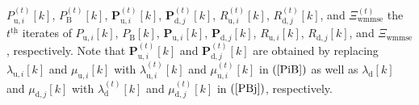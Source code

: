 \documentclass[10pt,journal]{IEEEtran}
\newcommand{\paren}[1]{\left({#1}\right)}
\newcommand{\bracket}[1]{{\left [{#1}\right ]}}
\newcommand{\ith}[1]    {{#1}^{\underline{\text{th}}}}
\newcommand{\PiB}{\mathbf{P}_{\textrm{u},i}\bracket{k}}
\newcommand{\PBj}{\mathbf{P}_{\textrm{d},j}\bracket{k}}
\theoremstyle{definition}
\begin{document}
		$P^{\paren{t}}_{\textrm{u},i}\bracket{k}$, $P^{\paren{t}}_{\textrm{B}}\bracket{k}$,
		$\mathbf{P}^{\paren{t}}_{\textrm{u},i}\bracket{k}$, $\mathbf{P}^{\paren{t}}_{\textrm{d},j}\bracket{k}$, $\mathit{R}^{\paren{t}}_{\textrm{u},i}\bracket{k}$, $\mathit{R}^{\paren{t}}_{\textrm{d},j}\bracket{k}$, and $\Xi^{\paren{t}}_{\textrm{wmmse}}$ the $\ith{t}$ iterates of $P_{\textrm{u},i}\bracket{k}$, $P_{\textrm{B}}\bracket{k}$,  $\PiB$, $\PBj$, $\mathit{R}_{\textrm{u},i}\bracket{k}$, $\mathit{R}_{\textrm{d},j}\bracket{k}$, and $\Xi_{\textrm{wmmse}}$, respectively. Note that $\mathbf{P}^{\paren{t}}_{\textrm{u},i}\bracket{k}$ and $\mathbf{P}^{\paren{t}}_{\textrm{d},j}\bracket{k}$ are obtained by replacing $\lambda_{\textrm{u},i}\bracket{k}$ and $\mu_{\textrm{u},i}\bracket{k}$ with $\lambda^{\paren{t}}_{\textrm{u},i}\bracket{k}$ and $\mu^{\paren{t}}_{\textrm{u},i}\bracket{k}$ in $\paren{\mathrm{\ref{PiB}}}$ as well as $\lambda_{\textrm{d}}\bracket{k}$ and $\mu_{\textrm{d},j}\bracket{k}$ with $\lambda^{\paren{t}}_{\textrm{d}}\bracket{k}$ and $\mu^{\paren{t}}_{\textrm{d},j}\bracket{k}$ in $\paren{\mathrm{\ref{PBj}}}$, respectively. %
		
\end{document}

